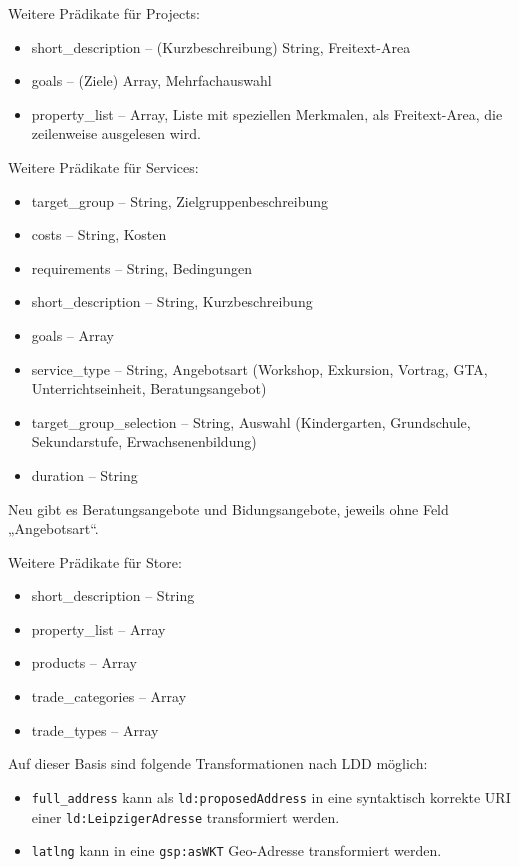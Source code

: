 \documentclass[a4paper,11pt]{article}
\begin{document}
Weitere Prädikate für Projects:
\begin{itemize}\itemsep0pt
  \item short\_description -- (Kurzbeschreibung) String, Freitext-Area
  \item goals -- (Ziele) Array, Mehrfachauswahl
  \item property\_list -- Array, Liste mit speziellen Merkmalen, als
    Freitext-Area, die zeilenweise ausgelesen wird. 
\end{itemize}

Weitere Prädikate für Services:
\begin{itemize}\itemsep0pt
  \item target\_group -- String, Zielgruppenbeschreibung
  \item costs -- String, Kosten
  \item requirements -- String, Bedingungen
  \item short\_description -- String, Kurzbeschreibung
  \item goals -- Array
  \item service\_type -- String, Angebotsart (Workshop, Exkursion, Vortrag,
    GTA, Unterrichtseinheit, Beratungsangebot)
  \item target\_group\_selection -- String, Auswahl (Kindergarten,
    Grundschule, Sekundarstufe, Erwachsenenbildung)
  \item duration -- String
\end{itemize}
Neu gibt es Beratungsangebote und Bidungsangebote, jeweils ohne Feld
„Angebotsart“.

Weitere Prädikate für Store:
\begin{itemize}\itemsep0pt
  \item short\_description -- String
  \item property\_list -- Array
  \item products -- Array
  \item trade\_categories -- Array
  \item trade\_types -- Array
\end{itemize}

Auf dieser Basis sind folgende Transformationen nach LDD möglich:
\begin{itemize}\raggedright
\item \texttt{full\_address} kann als \texttt{ld:proposedAddress} in eine
  syntaktisch korrekte URI einer \texttt{ld:LeipzigerAdresse} transformiert
  werden. 
\item \texttt{latlng} kann in eine \texttt{gsp:asWKT} Geo-Adresse
  transformiert werden.
\end{itemize}
\end{document}
